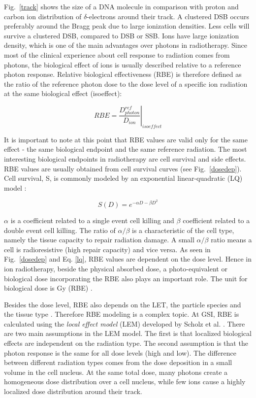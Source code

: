Fig.~\ref{track} shows the size of a DNA molecule in comparison with proton and carbon ion distribution of $\delta$-electrons around their track. 
A clustered DSB occurs preferably around the Bragg peak due to large ionization densities. Less cells will survive a clustered DSB, compared to DSB or SSB. Ions have large ionization density, which is one of the main advantages over photons in radiotherapy. Since most of the clinical experience about
cell response to radiation comes from photons, the biological effect of ions is usually described relative to a reference photon response. Relative biological effectiveness (RBE) is therefore defined as the ratio of the reference 
photon dose to the dose level of a specific ion radiation at the same biological effect (isoeffect):

\begin{equation}
 RBE = \left.\frac{D^{ref}_{photon}}{D_{ion}} \right|_{isoeffect}
\end{equation}

It is important to note at this point that RBE values are valid only for the same effect - the same biological endpoint and the same reference radiation. The most interesting biological endpoints in radiotherapy are cell survival and
side effects. RBE values are usually obtained from cell survival curves (see Fig.~\ref{dosedep}). Cell survival, S, is commonly modeled by an exponential linear-quadratic (LQ) model \cite{Fowler1989}:

\begin{equation}
 S(D) = e^{-\alpha D - \beta D^2}
 \label{lq}
\end{equation}

$\alpha$ is a coefficient related to a single event cell killing and $\beta$ coefficient related to a double event cell killing. The ratio of $\alpha / \beta$ is a characteristic of the cell type, namely the tissue 
capacity to repair radiation damage. A small $\alpha / \beta$ ratio means a cell is radioresistive (high repair capacity) and vice versa.
As seen in Fig.~\ref{dosedep} and Eq. \ref{lq}, RBE values are dependent on the dose level. Hence in ion radiotherapy, beside the physical absorbed dose, a photo-equivalent or biological dose incorporating the RBE also plays an important role. 
The unit for biological dose is Gy (RBE) \cite{ICRU2007}. 

Besides the dose level, RBE also depends on the LET, the particle species and the tissue type \cite{Kraft2000}. Therefore RBE modeling is a complex topic.
At GSI, RBE is calculated using the \textit{local effect model} (LEM) developed by Scholz et al. \cite{Scholz1994}. There are two main assumptions in the LEM model. The first is that localized biological 
effects are independent on the radiation type. The second assumption is that the photon response is the same for all dose levels (high and low).
The difference between different radiation types comes from the dose deposition in a small volume in the cell nucleus.
At the same total dose, many photons create a homogeneous dose distribution over a cell nucleus, while few ions cause a highly localized dose distribution around their track.

